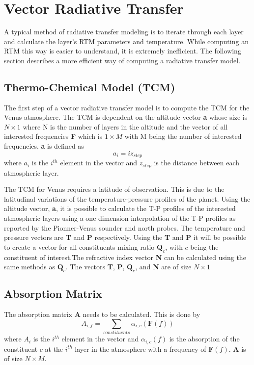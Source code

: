 \section{Vector Radiative Transfer}
A typical method of radiative transfer modeling is to iterate through each layer and calculate the layer's RTM parameters and temperature. 
While computing an RTM this way is easier to understand, it is extremely inefficient. The following section describes a more efficient way of computing a radiative transfer model.
\subsection{Thermo-Chemical Model (TCM)}
The first step of a vector radiative transfer model is to compute the TCM for the Venus atmosphere. The TCM is dependent on the altitude vector \textbf{a} whose size is $N\times 1$ where N is the number of layers in the altitude and the vector of all interested frequencies \textbf{F} which is $1 \times M$ with M being the number of interested frequencies. \textbf{a} is defined as
\begin{equation}
a_i = iz_{step}
\end{equation}
where $a_i$ is the $i^{th}$ element in the vector and $z_{step}$ is the distance between each atmospheric layer. 

The TCM for Venus requires a latitude of observation. This is due to the latitudinal variations of the temperature-pressure profiles of the planet. 
Using the altitude vector, \textbf{a}, it is possible to calculate the T-P profiles of the interested atmospheric layers using a one dimension interpolation of the T-P profiles as reported by the Pionner-Venus sounder and north probes. 
The temperature and pressure vectors are \textbf{T} and \textbf{P} respectively. Using the \textbf{T} and \textbf{P} it will be possible to create a vector for all constituents mixing ratio $\textbf{Q}_{c}$, with $c$ being the constituent of interest.The refractive index vector \textbf{N} can be calculated using the same methods as $\textbf{Q}_{c}$. The vectors \textbf{T}, \textbf{P}, $\textbf{Q}_{c}$, and \textbf{N} are of size $N\times 1$

\subsection{Absorption Matrix}
The absorption matrix \textbf{A} needs to be calculated. This is done by
\begin{equation}
A_{i,f} = \sum_{constituents} \alpha_{i,c}(\textbf{F}(f))
\end{equation}
where $A_i$ is the $i^{th}$ element in the vector and $\alpha_{i,c}(f)$ is the absorption of the constituent $c$ at the $i^{th}$ layer in the atmosphere with a frequency of $\textbf{F}(f)$. \textbf{A} is of size $N \times M$.

